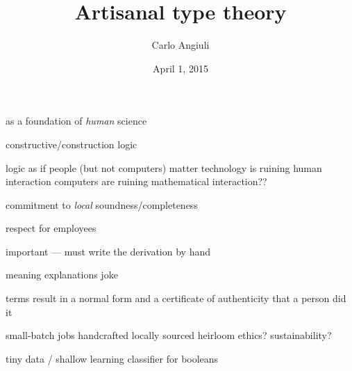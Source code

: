 \documentclass[10pt]{article}
\title{Artisanal type theory}
\author{Carlo Angiuli}
\date{April 1, 2015}
\begin{document}
\maketitle

as a foundation of \emph{human} science

constructive/construction logic

logic as if people (but not computers) matter
technology is ruining human interaction
computers are ruining mathematical interaction??

commitment to \emph{local} soundness/completeness

respect for employees

important --- must write the derivation by hand

meaning explanations joke

terms result in a normal form and a certificate of authenticity that a person did it

small-batch jobs
handcrafted
locally sourced
heirloom
ethics?
sustainability?

tiny data / shallow learning
classifier for booleans
\end{document}
